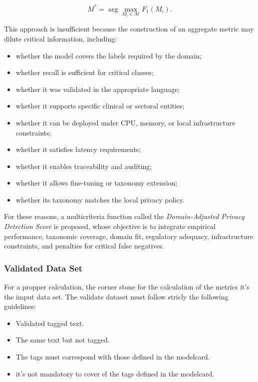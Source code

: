 \documentclass[11pt,a4paper]{article}
\begin{document}
\begin{equation}
    M^* = \arg\max_{M_i \in \mathcal{M}} F_1(M_i).
\end{equation}

This approach is insufficient because the construction of an aggregate metric may dilute critical information, including:

\begin{itemize}
    \item whether the model covers the labels required by the domain;
    \item whether recall is sufficient for critical classes;
    \item whether it was validated in the appropriate language;
    \item whether it supports specific clinical or sectoral entities;
    \item whether it can be deployed under CPU, memory, or local infrastructure constraints;
    \item whether it satisfies latency requirements;
    \item whether it enables traceability and auditing;
    \item whether it allows fine-tuning or taxonomy extension;
    \item whether its taxonomy matches the local privacy policy.
\end{itemize}

For these reasons, a multicriteria function called the \textit{Domain-Adjusted Privacy Detection Score} is proposed, whose objective is to integrate empirical performance, taxonomic coverage, domain fit, regulatory adequacy, infrastructure constraints, and penalties for critical false negatives.

\subsubsection{Validated Data Set}

For a propper calculation, the corner stone for the calculation of the metrics it's the imput data set. The validate dataset must follow stricly the following guidelines:

\begin{itemize}
    \item Validated tagged text.
    \item The same text but not tagged.
    \item The tags must correspond with those defined in the modelcard.
    \item it's not mandatory to cover el the tags defined in the modelcard.
\end{itemize}
\end{document}
